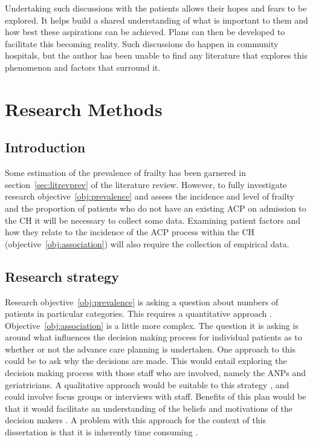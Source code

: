 \documentclass
[
	12pt,
	a4paper,
	oneside,
]{report}
\begin{document}
Undertaking such discussions with the patients allows their hopes and fears to
be explored. It helps build a shared understanding of what is important to
them and how best these aspirations can be achieved. Plans can then be 
developed to facilitate this becoming reality. Such discussions do happen in
community hospitals, but the author has been unable to find any literature
that explores this phenomenon and factors that surround it.

\chapter{Research Methods}
 
\section{Introduction}

Some estimation of the prevalence of frailty has been garnered in 
section~\ref{sec:litrevprev} of the literature review. However, to fully
investigate research objective~\ref{obj:prevalence} and assess the incidence
and level of frailty and the proportion of patients who do not have an
existing ACP on admission to the CH it will be necessary to collect some
data. Examining patient factors and how they relate to the incidence of
the ACP process within the CH (objective~\ref{obj:association}) will
also require the collection of empirical data.

\section{Research strategy}

Research objective~\ref{obj:prevalence} is asking a question about numbers
of patients in particular categories. This requires a quantitative approach
\parencite{biggam:15}.
Objective~\ref{obj:association} is a little more complex. The question it is 
asking is around what influences the decision making process for individual
patients as to whether or not the advance care planning is undertaken. One 
approach to this could be to ask why the decisions are made. This would 
entail exploring the decision making process with those staff who are 
involved, namely the ANPs and geriatricians. A qualitative approach would
be suitable to this strategy \parencite{jolley:13}, and could involve 
focus groups or interviews with staff. Benefits of this plan would be that it 
would facilitate an understanding of the beliefs and motivations of the 
decision makers \parencite{parahoo:14}. A problem with this approach for the
context of this dissertation is that it is inherently time consuming
\parencite{jolley:13}.
\end{document}
